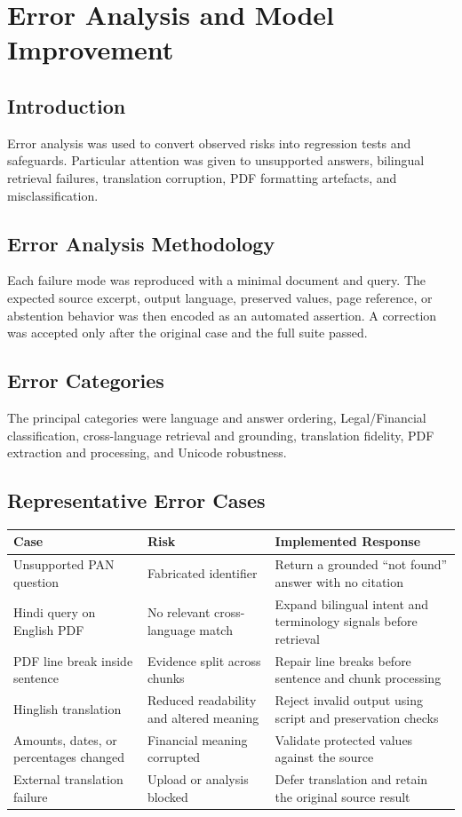 \chapter{Error Analysis and Model Improvement}
\label{chap:error_analysis}

\section{Introduction}
Error analysis was used to convert observed risks into regression tests and safeguards. Particular attention was given to unsupported answers, bilingual retrieval failures, translation corruption, PDF formatting artefacts, and misclassification.

\section{Error Analysis Methodology}
Each failure mode was reproduced with a minimal document and query. The expected source excerpt, output language, preserved values, page reference, or abstention behavior was then encoded as an automated assertion. A correction was accepted only after the original case and the full suite passed.

\section{Error Categories}
The principal categories were language and answer ordering, Legal/Financial classification, cross-language retrieval and grounding, translation fidelity, PDF extraction and processing, and Unicode robustness.

\section{Representative Error Cases}
\begin{longtable}{|p{3.8cm}|p{4.8cm}|p{5cm}|}
\hline
\textbf{Case} & \textbf{Risk} & \textbf{Implemented Response} \\
\hline
Unsupported PAN question & Fabricated identifier & Return a grounded ``not found'' answer with no citation \\
\hline
Hindi query on English PDF & No relevant cross-language match & Expand bilingual intent and terminology signals before retrieval \\
\hline
PDF line break inside sentence & Evidence split across chunks & Repair line breaks before sentence and chunk processing \\
\hline
Hinglish translation & Reduced readability and altered meaning & Reject invalid output using script and preservation checks \\
\hline
Amounts, dates, or percentages changed & Financial meaning corrupted & Validate protected values against the source \\
\hline
External translation failure & Upload or analysis blocked & Defer translation and retain the original source result \\
\hline
\end{longtable}

